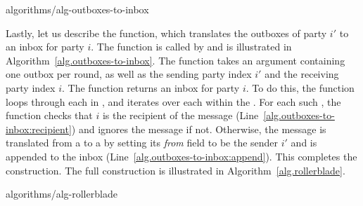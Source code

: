 {algorithms/alg-outboxes-to-inbox}

Lastly, let us describe the \outboxesToInbox function, which translates the outboxes
of party $i'$ to an inbox for party $i$. The function is called by \prepareEmulationInputs
and is illustrated in Algorithm~\ref{alg.outboxes-to-inbox}. The function takes an
\outboxes argument containing one outbox per round, as well as the sending party index
$i'$ and the receiving party index $i$. The function returns an inbox for party $i$.
To do this, the function loops through each \outbox in \outboxes, and iterates over each
\netin within the \outbox. For each such \netout, the function checks that $i$ is the
recipient of the message (Line~\ref{alg.outboxes-to-inbox:recipient}) and ignores the
message if not. Otherwise, the message is translated from a \netout to a \netin
by setting its \emph{from} field to be the sender $i'$ and is
appended to the inbox (Line~\ref{alg.outboxes-to-inbox:append}).
This completes the construction. The full construction is illustrated in
Algorithm~\ref{alg.rollerblade}.

{algorithms/alg-rollerblade}

